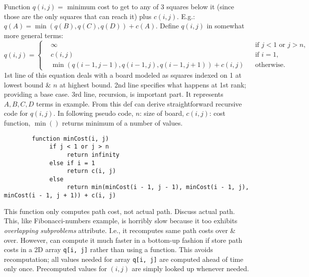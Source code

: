 \documentclass{article}
\begin{document}
\begin{enumerate}
	Function $q(i,j) =$ minimum cost to get to any of 3 squares below it (since those are the only squares that can reach it) plus $c(i,j)$. E.g.: $q(A) = \min(q(B),q(C),q(D)) + c(A)$. Define $q(i,j)$ in somewhat more general terms:
	\begin{equation*}
		q(i,j) = \left\{\begin{split}
			&\infty&&\mbox{if } j < 1\mbox{ or } j > n,\\
			&c(i,j)&&\mbox{if } i = 1,\\
			&\min(q(i - 1,j - 1),q(i - 1,j),q(i - 1,j + 1)) + c(i,j)&&\mbox{otherwise}.
		\end{split}\right.
	\end{equation*}
	1st line of this equation deals with a board modeled as squares indexed on 1 at lowest bound \& $n$ at highest bound. 2nd line specifies what happens at 1st rank; providing a base case. 3rd line, recursion, is important part. It represents $A,B,C,D$ terms in example. From this def can derive straightforward recursive code for $q(i,j)$. In following pseudo code, $n$: size of board, $c(i,j)$: cost function, $\min()$ returns minimum of a number of values.
	\begin{verbatim}
		function minCost(i, j)
		     if j < 1 or j > n
		          return infinity
		     else if i = 1
		          return c(i, j)
		     else
		          return min(minCost(i - 1, j - 1), minCost(i - 1, j), minCost(i - 1, j + 1)) + c(i, j)
	\end{verbatim}
	This function only computes path cost, not actual path. Discuss actual path. This, like Fibonacci-numbers example, is horribly slow because it too exhibits {\it overlapping subproblems} attribute. I.e., it recomputes same path costs over \& over. However, can compute it much faster in a bottom-up fashion if store path costs in a 2D array {\tt q[i, j]} rather than using a function. This avoids recomputation; all values needed for array {\tt q[i, j]} are computed ahead of time only once. Precomputed values for $(i,j)$ are simply looked up whenever needed.
	

\end{enumerate}
\end{document}
